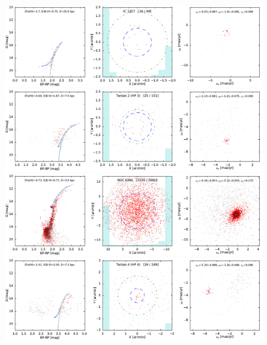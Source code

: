 \documentclass[usenatbib]{mnras}
\begin{document}
\clearpage\begin{figure}
\contcaption{}
\includegraphics{figs/IC_1257.pdf}
\includegraphics{figs/Terzan_2_HP_3.pdf}
\includegraphics{figs/NGC_6366.pdf}
\includegraphics{figs/Terzan_4_HP_4.pdf}
\end{figure}
\end{document}
